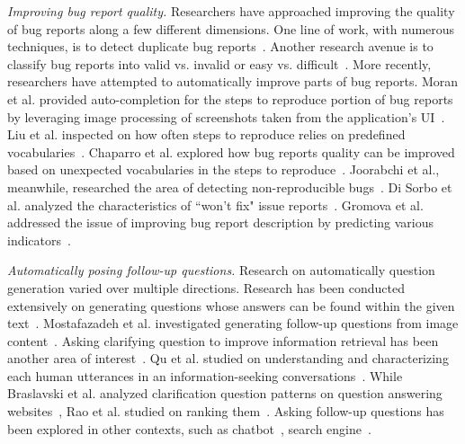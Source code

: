 \noindent
{\em Improving bug report quality.} Researchers have approached improving the quality of bug reports along a few different dimensions. One line of work, with numerous techniques, is to detect duplicate bug reports~\cite{chaparro19reformulating}. Another research avenue is to classify bug reports into valid vs. invalid or easy vs. difficult~\cite{fan20chaff,hooimeijer07modeling}. More recently, researchers have attempted to automatically improve parts of bug reports. Moran et al. provided auto-completion for the steps to reproduce portion of bug reports by leveraging image processing of screenshots taken from the application's UI~\cite{moran15autocompleting}. Liu et al. inspected on how often steps to reproduce relies on predefined vocabularies~\cite{liu2020automated}. Chaparro et al. explored how bug reports quality can be improved based on unexpected vocabularies in the steps to reproduce~\cite{Chaparro2019AssessingTQ}. Joorabchi et al., meanwhile, researched the area of detecting non-reproducible bugs~\cite{erfani2014works}. Di Sorbo et al. analyzed the characteristics of ``won't fix" issue reports~\cite{Sorbo2019WontWF}. Gromova et al. addressed the issue of improving bug report description by predicting various indicators~\cite{gromova2019raising}.

\noindent
{\em Automatically posing follow-up questions.} Research on automatically question generation varied over multiple directions. Research has been conducted extensively on generating questions whose answers can be found within the given text~\cite{vanderwende2008importance, rus2011question, zhou2017neural, heilman2010good, duan2017question,  du2017learning}. Mostafazadeh et al. investigated generating follow-up questions from image content~\cite{Mostafazadeh_2016}. Asking clarifying question to improve information retrieval has been another area of interest~\cite{10.1145/3366423.3380126, 10.1145/3331184.3331265, stoyanchev2014towards}.  Qu et al. studied on understanding and characterizing each human utterances in an information-seeking conversations~\cite{10.1145/3209978.3210124}. While Braslavski et al. analyzed clarification question patterns on question answering websites~\cite{10.1145/3020165.3022149}, Rao et al. studied on ranking them~\cite{rao-daume-iii-2018-learning}. Asking follow-up questions has been explored in other contexts, such as chatbot~\cite{Hancock2019LearningFD}, search engine~\cite{Ren2020ConversationsWS}.
